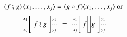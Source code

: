 \begin{definition}
\begin{itemize}
\begin{align*}
(f\fatsemi g) \, \langle x_1,\ldots,x_j\rangle 
  & =  (g\circ f) \langle x_1,\ldots,x_j\rangle
\textrm{ or }
\end{align*}
\begin{align*}
\arraycolsep=1.4pt
\begin{array}{rcl}
 \left. {\scriptsize \begin{array}{r} 
                       x_1\\ \cdots\\ x_j
                     \end{array}} \right[
 & \rprSCom{f}{g} &
 \left] {\scriptsize \begin{array}{l}
                       y_1\\ \cdots\\ y_j
                     \end{array} } \right.
\end{array}
& =
\arraycolsep=1.4pt
\begin{array}{rcl}
 \left. {\scriptsize \begin{array}{r} 
                       x_1\\ \cdots\\ x_j
                     \end{array}} \right[
 & f &
 \left] {\hspace{-1.6em}
         \phantom{\scriptsize \begin{array}{r} 
                        x_1\\ \cdots\\ x_j
                      \end{array}
                 }
        } \right.
\end{array}
\arraycolsep=1.4pt
\begin{array}{rcl}
 \left. {\hspace{-1.6em}
          \phantom{\scriptsize \begin{array}{r} 
                         x_1\\ \cdots\\ x_j
                       \end{array}
                  }
         } \right[
 & g &
 \left] {\scriptsize \begin{array}{l}
                       y_1\\ \cdots\\ y_j
                     \end{array} } \right.
\end{array}

\end{align*}
\end{itemize}
\end{definition}
